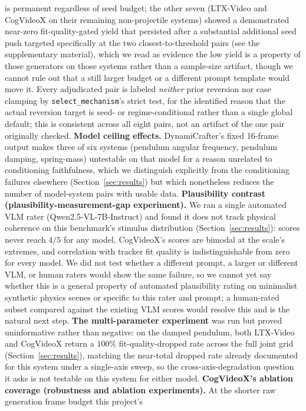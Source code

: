 \documentclass[10pt,twocolumn,letterpaper]{article}
\begin{document}
is permanent regardless of seed budget; the other seven (LTX-Video and
CogVideoX on their remaining non-projectile systems) showed a demonstrated
near-zero fit-quality-gated yield that persisted after a substantial
additional seed push targeted specifically at the two closest-to-threshold
pairs (see the supplementary material), which we read as evidence the low yield
is a property of those generators on those systems rather than a
sample-size artifact, though we cannot rule out that a still larger budget
or a different prompt template would move it. Every adjudicated pair is
labeled \emph{neither} prior reversion nor case clamping by \texttt{select\_mechanism}'s strict
test, for the identified reason that the actual reversion target is seed-
or regime-conditional rather than a single global default; this is
consistent across all eight pairs, not an artifact of the one pair
originally checked. \textbf{Model
ceiling effects.} DynamiCrafter's fixed 16-frame output makes three of six
systems (pendulum angular frequency, pendulum damping, spring-mass)
untestable on that model for a reason unrelated to conditioning faithfulness, which we distinguish
explicitly from the conditioning failures elsewhere (Section~\ref{sec:results})
but which nonetheless reduces the number of model-system pairs with usable
data. \textbf{Plausibility contrast (plausibility-measurement-gap experiment).} We ran a single automated VLM rater
(Qwen2.5-VL-7B-Instruct) and found it does not track physical coherence on
this benchmark's stimulus distribution (Section~\ref{sec:results}): scores
never reach $4/5$ for any model, CogVideoX's scores are bimodal at the
scale's extremes, and correlation with tracker fit quality is
indistinguishable from zero for every model. We did not test whether a
different prompt, a larger or different VLM, or human raters would show the
same failure, so we cannot yet say whether this is a general property of
automated plausibility rating on minimalist synthetic physics scenes or
specific to this rater and prompt; a human-rated subset compared against
the existing VLM scores would resolve this and is the natural next step.
\textbf{The multi-parameter experiment} was run but proved uninformative
rather than negative: on the damped pendulum, both LTX-Video and CogVideoX
return a $100\%$ fit-quality-dropped rate across the full joint grid
(Section~\ref{sec:results}), matching the near-total dropped rate already
documented for this system under a single-axis sweep, so the
cross-axis-degradation question it asks is not testable on this system for
either model.
\textbf{CogVideoX's ablation
coverage (robustness and ablation experiments).} At the shorter raw generation frame budget this project's
\end{document}
